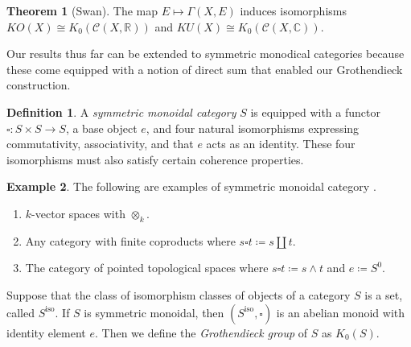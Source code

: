 \documentclass[10pt,letterpaper,cm]{nupset}
\theoremstyle{definition}
\newtheorem{definition}{Definition}
\newtheorem{exmp}[definition]{Example}
\theoremstyle{theorem}
\newtheorem{theorem}{Theorem}
\theoremstyle{remark}
\newcommand{\C}{\mathbb C}
\newcommand{\R}{\mathbb R}
\newcommand{\1}{\mathbf{1}}
\newcommand{\0}{\vec 0}
\DeclareMathOperator{\iso}{iso}
\begin{document}
\begin{theorem}[Swan]
The map $E \mapsto \Gamma(X, E)$ induces isomorphisms $KO(X) \cong K_0(\mathcal C(X, \R))$ and $KU(X) \cong K_0( \mathcal C(X, \C))$.
\end{theorem}

\smallskip

Our results thus far can be extended to symmetric monodical categories because these come equipped with a notion of direct sum that enabled our Grothendieck construction. 

\begin{definition}
A \textit{symmetric monoidal category} $S$ is equipped with a functor $\square : S \times S \to S$, a base object $e$, and four natural isomorphisms expressing commutativity, associativity, and that $e$ acts as an identity. These four isomorphisms must also satisfy certain coherence properties.
\end{definition}

\begin{exmp} The following are examples of symmetric monoidal category	.
\begin{enumerate}
\item $k$-vector spaces with $\otimes_k$.
\item Any category with finite coproducts where $s \square t\coloneqq s \amalg t$.
\item The category of pointed topological spaces where $s \square t \coloneqq s \wedge t $ and $e\coloneqq S^0$.
\end{enumerate} 
\end{exmp}

Suppose that the class of isomorphism classes of objects of a category $S$ is a set, called $S^{\iso}$. If $S$ is symmetric monoidal, then $\left(S^{\iso}, \square\right)$ is an abelian monoid with identity element $e$. Then we define the \textit{Grothendieck group} of $S$ as $K_0(S)$.
\end{document}
